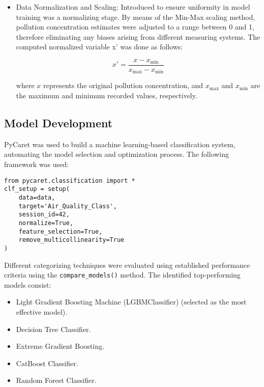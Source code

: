 \documentclass[conference]{IEEEtran}
\begin{document}
\begin{itemize}
    \item Data Normalization and Scaling: Introduced to ensure uniformity in model training was a normalizing stage. By means of the Min-Max scaling method, pollution concentration estimates were adjusted to a range between 0 and 1, therefore eliminating any biases arising from different measuring systems. The computed normalized variable x’ was done as follows:

    \begin{equation}
    x' = \frac{x - x_{\text{min}}}{x_{\text{max}} - x_{\text{min}}} \tag{5}
    \end{equation}
    \vspace{5pt}
    
    where \( x \) represents the original pollution concentration, and \( x_{\text{max}} \) and \( x_{\text{min}} \) are the maximum and minimum recorded values, respectively.
    
\end{itemize}

\subsection{Model Development}\label{AA}
PyCaret was used to build a machine learning-based classification system, automating the model selection and optimization process. The following framework was used:

\begin{verbatim}
from pycaret.classification import *
clf_setup = setup(
    data=data,
    target='Air_Quality_Class',
    session_id=42,
    normalize=True,
    feature_selection=True,
    remove_multicollinearity=True
)
\end{verbatim}

Different categorizing techniques were evaluated using established performance criteria using the \texttt{compare\_models()} method. The identified top-performing models consist:

\begin{itemize}
    \item Light Gradient Boosting Machine (LGBMClassifier) (selected as the most effective model).
    \item Decision Tree Classifier.
    \item Extreme Gradient Boosting.
    \item CatBoost Classifier.
    \item Random Forest Classifier.
\end{itemize}
\end{document}
